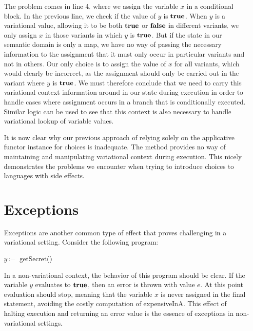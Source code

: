 \documentclass[12pt,oneside]{book}
\begin{document}
The problem comes in line 4, where we assign the variable $x$ in a conditional block. In the previous line, we check if the value of
$y$ is $\textbf{\textup{\textrm{true}}}$. When $y$ is a variational value, allowing it to be both $\textbf{\textup{\textrm{true}}}$ or $\textbf{\textup{\textrm{false}}}$ in different variants, we only assign $x$ in those variants
in which $y$ is $\textbf{\textup{\textrm{true}}}$. But if the state in our semantic domain is only a map, we have no way of passing the necessary information to the
assignment that it must only occur in particular variants and not in others. Our only choice is to assign the value of $x$ for all variants,
which would clearly be incorrect, as the assignment should only be carried out in the variant where $y$ is $\textbf{\textup{\textrm{true}}}$. We must therefore
conclude that we need to carry this variational context information around in our state during execution in order to handle cases where
assignment occurs in a branch that is conditionally executed. Similar logic can be used to see that this context is also necessary to handle
variational lookup of variable values.

It is now clear why our previous approach of relying solely on the applicative functor instance for choices is inadequate. The method provides
no way of maintaining and manipulating variational context during execution. This nicely demonstrates the problems we encounter when
trying to introduce choices to languages with side effects.

\section{Exceptions}
\label{sec:except}

Exceptions are another common type of effect that proves challenging in a variational setting.
Consider the following program:

\begin{samepage}
\begin{algorithmic}
\STATE $y \coloneqq$ getSecret()
\ENDIF
{}
\end{algorithmic}
\end{samepage}

In a non-variational context, the behavior of this program should be clear.
If the variable $y$ evaluates to $\textbf{\textup{\textrm{true}}}$, then an error is thrown with value
$e$. At this point evaluation should stop, meaning that the variable $x$ is never
assigned in the final statement, avoiding the costly computation of expensiveInA. This effect of halting execution and
returning an error value is the essence of exceptions in non-variational settings.
\end{document}
